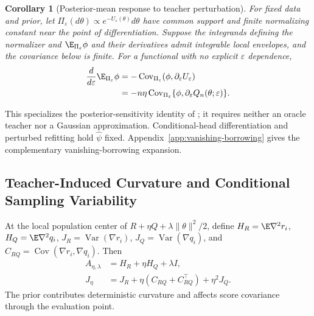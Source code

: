 \documentclass{article} %
\newtheorem{corollary}[proposition]{Corollary}
\begin{document}
\begin{corollary}[Posterior-mean response to teacher perturbation]
\label{cor:posterior-sensitivity}
For fixed data and prior, let $\Pi_\varepsilon(d\theta)\propto e^{-U_\varepsilon(\theta)}d\theta$ have common support and finite normalizing constant near the point of differentiation. Suppose the integrands defining the normalizer and $\E_{\Pi_\varepsilon}\phi$ and their derivatives admit integrable local envelopes, and the covariance below is finite. For a functional with no explicit $\varepsilon$ dependence,
\begin{equation}
\begin{aligned}
\frac{d}{d\varepsilon}\E_{\Pi_\varepsilon}\phi
&=-\operatorname{Cov}_{\Pi_\varepsilon}(\phi,\partial_\varepsilon U_\varepsilon)\\
&=-n\eta\operatorname{Cov}_{\Pi_\varepsilon}
\{\phi,\partial_\varepsilon Q_n(\theta;\varepsilon)\}.
\end{aligned}
\label{eq:posterior-sensitivity}
\end{equation}
\end{corollary}
This specializes the posterior-sensitivity identity of \citet{gustafson1996sensitivity}; it requires neither an oracle teacher nor a Gaussian approximation. Conditional-head differentiation and perturbed refitting hold $\widehat\psi$ fixed. Appendix~\ref{app:vanishing-borrowing} gives the complementary vanishing-borrowing expansion.

\subsection{Teacher-Induced Curvature and Conditional Sampling Variability}
\label{sec:local-spread-main}
At the local population center of $R+\eta Q+\lambda\|\theta\|^2/2$, define $H_R=\E\nabla^2r_i$, $H_Q=\E\nabla^2q_i$, $J_R=\operatorname{Var}(\nabla r_i)$, $J_Q=\operatorname{Var}(\nabla q_i)$, and $C_{RQ}=\operatorname{Cov}(\nabla r_i,\nabla q_i)$. Then
\begin{equation}
\begin{aligned}
A_{\eta,\lambda}&=H_R+\eta H_Q+\lambda I,\\
J_\eta&=J_R+\eta(C_{RQ}+C_{RQ}^\top)+\eta^2J_Q.
\end{aligned}
\label{eq:curvature-score-decomposition}
\end{equation}
The prior contributes deterministic curvature and affects score covariance through the evaluation point.
\end{document}
